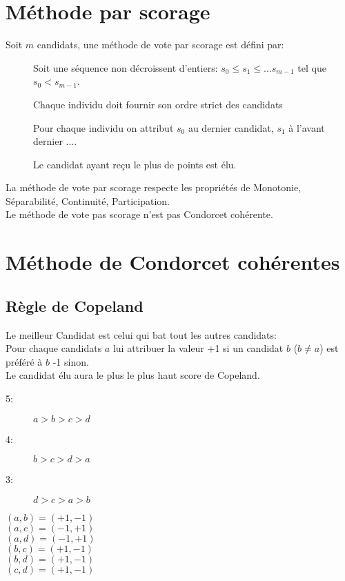 \section{Méthode par scorage}

Soit $m$ candidats, une méthode de vote par scorage est défini par:
\begin{description}
\item[] Soit une séquence non décroissent d'entiers: $s_0 \leq s_1 \leq ... s_{m-1}$ tel que $s_0 < s_{m-1}$.
\item[] Chaque individu doit fournir son ordre strict des candidats
\item[] Pour chaque individu on attribut $s_0$ au dernier candidat, $s_1$ à l'avant dernier ....
\item[] Le candidat ayant reçu le plus de points est élu.
\end{description}

La méthode de vote par scorage respecte les propriétés de Monotonie, Séparabilité, Continuité, Participation.\\
Le méthode de vote pas scorage n'est pas Condorcet cohérente.\\

\pagebreak
\section{Méthode de Condorcet cohérentes}

\subsection{Règle de Copeland}
Le meilleur Candidat est celui qui bat tout les autres candidats:\\
Pour chaque candidats $a$ lui attribuer la valeur +1 si un candidat $b$ ($b \neq a$) est préféré à $b$ -1 sinon.\\
Le candidat élu aura le plus le plus haut score de Copeland.\\

\begin{description}
\item[5:] $a > b > c > d$
\item[4:] $b > c > d > a$
\item[3:] $d > c > a > b$
\end{description}

\begin{multicols}{3}
$(a,b) = (+1,-1)$\\$(a,c) = (-1,+1)$\\$(a,d) = (-1,+1)$\\
$(b,c) = (+1,-1)$\\$(b,d) = (+1,-1)$\\$(c,d) = (+1,-1)$\\
\end{multicols}

